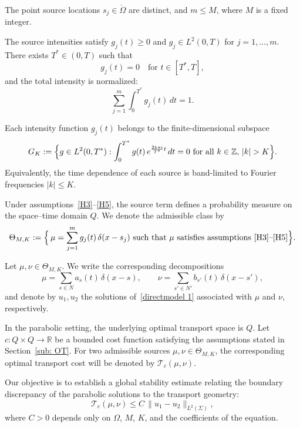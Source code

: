 \documentclass[12pt]{amsart}
\begin{document}
\begin{Henum}[start=3]
    \item\label{H3} 
    The point source locations \(s_j\in\mathring{\Omega}\) are distinct, and \(m\le M\), where \(M\) is a fixed integer.

    \item\label{H4} 
    The source intensities satisfy \(g_j(t)\ge0\) and \(g_j\in L^2(0,T)\) for \(j=1,\dots,m\). 
    There exists \(T^*\in(0,T)\) such that
    \[
    g_j(t)=0 \quad \text{for } t\in[T^*,T],
    \]
    and the total intensity is normalized:
    \[
    \sum_{j=1}^m \int_{0}^{T^*} g_j(t)\,dt = 1.
    \]

    \item\label{H5}
    Each intensity function \(g_j(t)\) belongs to the finite-dimensional subspace
    \begin{equation}\label{def:GK}
        G_K := \Bigl\{
        g\in L^2(0,T^*) :
        \int_{0}^{T^*} g(t)\,e^{\frac{2k\pi \mathrm{i}}{T^*}t}\,dt = 0
        \ \text{for all } k\in\mathbb{Z},\,|k|>K
        \Bigr\}.
    \end{equation}
    Equivalently, the time dependence of each source is band-limited to Fourier frequencies \(|k|\le K\).
\end{Henum}

Under assumptions~\ref{H3}--\ref{H5}, the source term defines a probability measure on the space--time domain \(Q\). 
We denote the admissible class by
\[
\Theta_{M,K} := 
\Bigl\{\,
\mu = \sum_{j=1}^m g_j(t)\,\delta(x-s_j)
\ \text{such that } \mu \text{ satisfies assumptions \ref{H3}--\ref{H5}}
\Bigr\}.
\]

Let \(\mu,\nu\in\Theta_{M,K}\). 
We write the corresponding decompositions
\[
\mu = \sum_{s\in N} a_s(t)\,\delta(x-s),
\qquad
\nu = \sum_{s'\in N'} b_{s'}(t)\,\delta(x-s'),
\]
and denote by \(u_1,u_2\) the solutions of~\eqref{directmodel 1} associated with \(\mu\) and \(\nu\), respectively.

In the parabolic setting, the underlying optimal transport space is \(Q\). 
Let \(c:Q\times Q\to\mathbb{R}\) be a bounded cost function satisfying the assumptions stated in Section~\ref{sub: OT}. 
For two admissible sources \(\mu,\nu\in\Theta_{M,K}\), the corresponding optimal transport cost will be denoted by \(\mathcal{T}_c(\mu,\nu)\).

Our objective is to establish a global stability estimate relating the boundary discrepancy of the parabolic solutions to the transport geometry:
\begin{equation}\label{para stability}
    \mathcal{T}_c(\mu, \nu) 
    \le C\, \|u_1 - u_2\|_{L^2(\Sigma)},
\end{equation}
where \(C>0\) depends only on \(\Omega\), \(M\), \(K\), and the coefficients of the equation.
\end{document}
